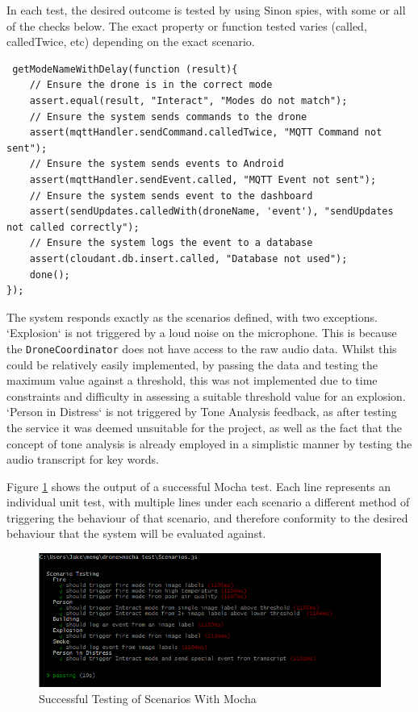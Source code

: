 \documentclass{article}
\begin{document}
In each test, the desired outcome is tested by using Sinon spies, with some or all of the checks below. The exact property or function tested varies (called, calledTwice, etc) depending on the exact scenario.
\begin{lstlisting}
 getModeNameWithDelay(function (result){
	// Ensure the drone is in the correct mode
	assert.equal(result, "Interact", "Modes do not match"); 
	// Ensure the system sends commands to the drone
	assert(mqttHandler.sendCommand.calledTwice, "MQTT Command not sent"); 
	// Ensure the system sends events to Android
	assert(mqttHandler.sendEvent.called, "MQTT Event not sent"); 
	// Ensure the system sends event to the dashboard
	assert(sendUpdates.calledWith(droneName, 'event'), "sendUpdates not called correctly");
	// Ensure the system logs the event to a database
	assert(cloudant.db.insert.called, "Database not used"); 
	done();               
});
\end{lstlisting}

The system responds exactly as the scenarios defined, with two exceptions. `Explosion` is not triggered by a loud noise on the microphone. This is because the \texttt{DroneCoordinator} does not have access to the raw audio data. Whilst this could be relatively easily implemented, by passing the data and testing the maximum value against a threshold, this was not implemented due to time constraints and difficulty in assessing a suitable threshold value for an explosion. `Person in Distress` is not triggered by Tone Analysis feedback, as after testing the service it was deemed unsuitable for the project, as well as the fact that the concept of tone analysis is already employed in a simplistic manner by testing the audio transcript for key words.

Figure \ref{fig:MochaScenarios} shows the output of a successful Mocha test. Each line represents an individual unit test, with multiple lines under each scenario a different method of triggering the behaviour of that scenario, and therefore conformity to the desired behaviour that the system will be evaluated against. 

\begin{figure}[h]
\centering
\caption{Successful Testing of Scenarios With Mocha\label{fig:MochaScenarios}}
\includegraphics[width=\textwidth]{MochaScenarios}
\end{figure}
\end{document}
